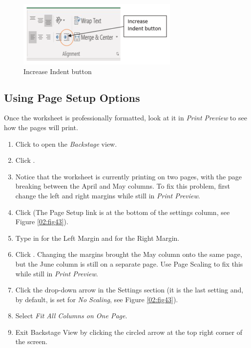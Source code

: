 \begin{figure}[H]
	\centering
	\includegraphics[width=\maxwidth{.95\linewidth}]{gfx/ch02_fig42}
	\caption{Increase Indent button}
	\label{02:fig42}
\end{figure}

\subsection{Using Page Setup Options}

Once the worksheet is professionally formatted, look at it in \textit{Print Preview} to see how the pages will print.

\begin{enumbox}
	\begin{enumerate}
		\item Click  to open the \textit{Backstage} view. 
		\item Click .
		\item Notice that the worksheet is currently printing on two pages, with the page breaking between the April and May columns. To fix this problem, first change the left and right margins while still in \textit{Print Preview}.
		\item Click  (The Page Setup link is at the bottom of the settings column, see Figure \ref{02:fig43}).
		\item Type in  for the Left Margin and  for the Right Margin.
		\item Click . Changing the margins brought the May column onto the same page, but the June column is still on a separate page. Use Page Scaling to fix this while still in \textit{Print Preview}.
		\item Click the  drop-down arrow in the Settings section (it is the last setting and, by default, is set for \textit{No Scaling}, see Figure \ref{02:fig43}).
		\item Select \textit{Fit All Columns on One Page}.
		\item Exit Backstage View by clicking the circled arrow at the top right corner of the screen.
	\end{enumerate}
\end{enumbox}

